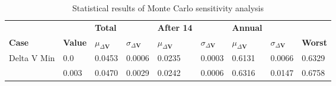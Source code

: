 \begin{table}[H]
\centering
\begin{tabular}{lllllllll}
 &  & \cellcolor[HTML]{EFEFEF}\textbf{Total} &  & \cellcolor[HTML]{EFEFEF}\textbf{After 14} & & \cellcolor[HTML]{EFEFEF}\textbf{Annual} & &\\
\rowcolor[HTML]{EFEFEF} 
\textbf{Case} & \textbf{Value} & \textbf{$\mu_{\Delta \boldsymbol{V}}$} & \textbf{$\sigma_{\Delta \boldsymbol{V}}$} & \textbf{$\mu_{\Delta \boldsymbol{V}}$} & \textbf{$\sigma_{\Delta \boldsymbol{V}}$} & \textbf{$\mu_{\Delta \boldsymbol{V}}$} & \textbf{$\sigma_{\Delta \boldsymbol{V}}$} & \textbf{Worst} \\ 
Delta V Min & 0.0 & 0.0453 & 0.0006 & 0.0235 & 0.0003 & 0.6131 & 0.0066 & 0.6329 \\ 
 & 0.003 & 0.0470 & 0.0029 & 0.0242 & 0.0006 & 0.6316 & 0.0147 & 0.6758 \\ 
\end{tabular}
\caption{Statistical results of Monte Carlo sensitivity analysis}
\label{tab:SensitivityAnalysis}
\end{table}